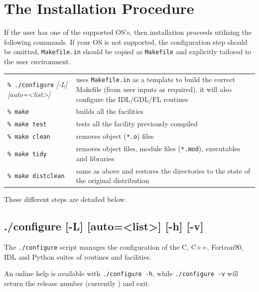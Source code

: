 \documentclass[12pt,twoside]{article}
\makeatletter
\newcommand{\doubledash}{\latexhtml{-{}-}{-{}--}}
\newcommand{\nop}[1]{\Hy@raisedlink{\hypertarget{#1}{}}}
\newcommand{\mytarget}[1]{\nop{#1}}%
\newcommand{\mytarget}[1]{\label{#1}}
\makeatother
\begin{document}
\section{The Installation Procedure}

If the user has one of the supported OS's, then installation proceeds utilizing
the following commands. If your OS is not supported, the configuration step
should be omitted, \texttt{Makefile.in} should be copied as \texttt{Makefile} and explicitly
tailored to the user environment.


\begin{flushright}
\begin{tabular}{p{0.3\hsize} p{0.60\hsize}}
\texttt{\% ./configure} {\em [-L] [\doubledash auto=<list>]}    & uses \texttt{Makefile.in} as a template to build 
                         the correct Makefile (from user inputs as required), it
                         will also configure the IDL/GDL/FL routines\\
\texttt{\% make}           & builds all the facilities \\
\texttt{\% make test}      & tests all the facility previously compiled \\
\texttt{\% make clean}     & removes object (\texttt{*.o}) files \\
\texttt{\% make tidy}      & removes object files, module files (\texttt{*.mod}), executables and libraries \\
\texttt{\% make distclean} & same as above and restores the directories to the state of the 
                          original distribution \\
\end{tabular}
\end{flushright}
These different steps are detailed below.

\subsection{./configure [-L] [\doubledash auto=<list>] [-h] [-v]}
\label{sub:configure}
\mytarget{install:configure}
The \texttt{./configure} script manages the configuration of the C, C++,
Fortran90, IDL and Python suites of routines and facilities.

An online help is available with 
\texttt{./configure~-h}, while 
\texttt{./configure~-v} 
will return the \healpix release number (currently \hpxversion) and exit.
\end{document}
